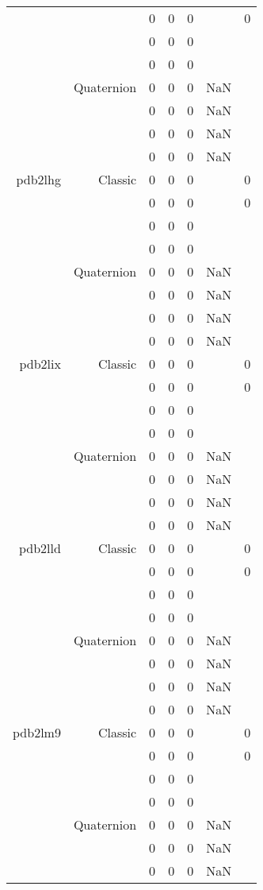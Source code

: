 \begin{xltabular}{\textwidth}{r|rcccSc}
& & 0 & 0 & 0 & & 0 \\
& & 0 & 0 & 0 & & \\
& & 0 & 0 & 0 & & \\
& Quaternion & 0 & 0 & 0 & NaN & \\
& & 0 & 0 & 0 & NaN & \\
& & 0 & 0 & 0 & NaN & \\
& & 0 & 0 & 0 & NaN & \\ \addlinespace
pdb2lhg & Classic & 0 & 0 & 0 & & 0 \\
& & 0 & 0 & 0 & & 0 \\
& & 0 & 0 & 0 & & \\
& & 0 & 0 & 0 & & \\
& Quaternion & 0 & 0 & 0 & NaN & \\
& & 0 & 0 & 0 & NaN & \\
& & 0 & 0 & 0 & NaN & \\
& & 0 & 0 & 0 & NaN & \\ \addlinespace
pdb2lix & Classic & 0 & 0 & 0 & & 0 \\
& & 0 & 0 & 0 & & 0 \\
& & 0 & 0 & 0 & & \\
& & 0 & 0 & 0 & & \\
& Quaternion & 0 & 0 & 0 & NaN & \\
& & 0 & 0 & 0 & NaN & \\
& & 0 & 0 & 0 & NaN & \\
& & 0 & 0 & 0 & NaN & \\ \addlinespace
pdb2lld & Classic & 0 & 0 & 0 & & 0 \\
& & 0 & 0 & 0 & & 0 \\
& & 0 & 0 & 0 & & \\
& & 0 & 0 & 0 & & \\
& Quaternion & 0 & 0 & 0 & NaN & \\
& & 0 & 0 & 0 & NaN & \\
& & 0 & 0 & 0 & NaN & \\
& & 0 & 0 & 0 & NaN & \\ \addlinespace
pdb2lm9 & Classic & 0 & 0 & 0 & & 0 \\
& & 0 & 0 & 0 & & 0 \\
& & 0 & 0 & 0 & & \\
& & 0 & 0 & 0 & & \\
& Quaternion & 0 & 0 & 0 & NaN & \\
& & 0 & 0 & 0 & NaN & \\
& & 0 & 0 & 0 & NaN & \\

\end{xltabular}
